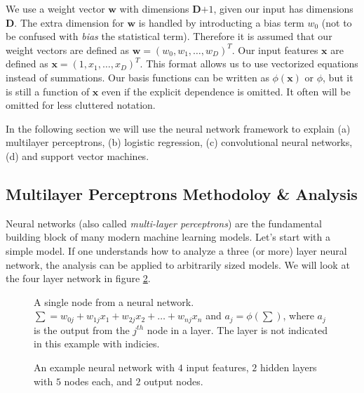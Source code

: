 \message{ !name(main.tex)}\documentclass[11pt]{article}
\begin{document}
We use a weight vector $\mathbf{w}$ with dimensions \textbf{D$+1$}, given our input has dimensions \textbf{D}. The extra dimension for $\mathbf{w}$ is handled by introducting a bias term $w_0$ (not to be confused with \emph{bias} the statistical term). Therefore it is assumed that our weight vectors are defined as $\mathbf{w} = (w_{0},w_{1},\ldots,w_{D})^{T}$. Our input features $\mathbf{x}$ are defined as $\mathbf{x} = (1,x_{1},\ldots,x_{D})^{T}$. This format allows us to use vectorized equations instead of summations. Our basis functions can be written as $\phi(\mathbf{x})$ or $\phi$, but it is still a function of $\mathbf{x}$ even if the explicit dependence is omitted. It often will be omitted for less cluttered notation.

\par
In the following section we will use the neural network framework to explain (a) multilayer perceptrons, (b) logistic regression, (c) convolutional neural networks, (d) and support vector machines. 

\subsection{Multilayer Perceptrons Methodoloy \&  Analysis}
\par
Neural networks (also called \emph{multi-layer perceptrons}) are the fundamental building block of many modern machine learning models. Let's start with a simple model. If one understands how to analyze a three (or more) layer neural network, the analysis can be applied to arbitrarily sized models. We will look at the four layer network in figure \ref{fig:mlp_ex}.

\begin{minipage}{0.47\linewidth}
  \begin{figure}[H]
    \centering
    
    \caption{A single node from a neural network. $\sum = w_{0j} + w_{1j}x_{1} + w_{2j}x_{2} + \ldots + w_{nj}x_{n}$ and $a_j = \phi(\sum)$, where $a_j$ is the output from the $j^{th}$ node in a layer. The layer is not indicated in this example with indicies.}
    \label{fig:node}
  \end{figure}
\end{minipage}\hfill
\begin{minipage}{0.47\linewidth}
  \begin{figure}[H]
    \centering
    
    \caption{An example neural network with $4$ input features, $2$ hidden layers with $5$ nodes each, and $2$ output nodes.}
    \label{fig:mlp_ex}
  \end{figure}
\end{minipage}\vspace{0.5cm}
\end{document}
